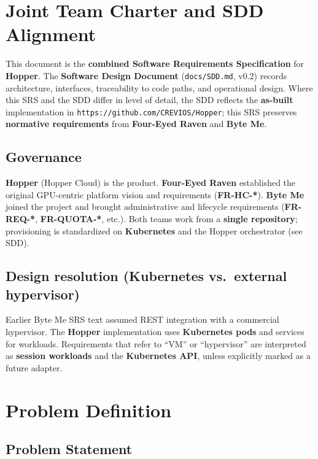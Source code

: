 \documentclass[12pt,a4paper]{article}
\begin{document}
\newpage
\section{Joint Team Charter and SDD Alignment}

\begin{notebox}
This document is the \textbf{combined Software Requirements Specification} for \textbf{Hopper}. The \textbf{Software Design Document} (\texttt{docs/SDD.md}, v0.2) records architecture, interfaces, traceability to code paths, and operational design. Where this SRS and the SDD differ in level of detail, the SDD reflects the \textbf{as-built} implementation in \texttt{https://github.com/CREVIOS/Hopper}; this SRS preserves \textbf{normative requirements} from \textbf{Four-Eyed Raven} and \textbf{Byte Me}.
\end{notebox}

\subsection{Governance}
\textbf{Hopper} (Hopper Cloud) is the product. \textbf{Four-Eyed Raven} established the original GPU-centric platform vision and requirements (\textbf{FR-HC-*}). \textbf{Byte Me} joined the project and brought administrative and lifecycle requirements (\textbf{FR-REQ-*}, \textbf{FR-QUOTA-*}, etc.). Both teams work from a \textbf{single repository}; provisioning is standardized on \textbf{Kubernetes} and the Hopper orchestrator (see SDD).

\subsection{Design resolution (Kubernetes vs.\ external hypervisor)}
Earlier Byte Me SRS text assumed REST integration with a commercial hypervisor. The \textbf{Hopper} implementation uses \textbf{Kubernetes pods} and services for workloads. Requirements that refer to ``VM'' or ``hypervisor'' are interpreted as \textbf{session workloads} and the \textbf{Kubernetes API}, unless explicitly marked as a future adapter.

\newpage
\section{Problem Definition}

\subsection{Problem Statement}
\end{document}
